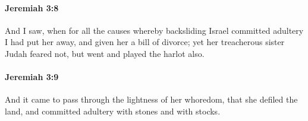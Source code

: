 		\paragraph{Jeremiah 3:8} %
			\label{JEREMIAH-3-8}

			And I saw, when for all the causes whereby backsliding Israel committed adultery I had put her away, and given her a bill of divorce; yet her treacherous sister Judah feared not, but went and played the harlot also.


		\paragraph{Jeremiah 3:9} %
			\label{JEREMIAH-3-9}

			And it came to pass through the lightness of her whoredom, that she defiled the land, and committed adultery with stones and with stocks.


